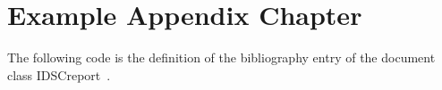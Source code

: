 
\chapter{Example Appendix Chapter}
\label{chp:ExampleAppendixChapter}

The following code is the definition of the bibliography entry of the document class IDSCreport~\cite{IDSCreportClass}.

